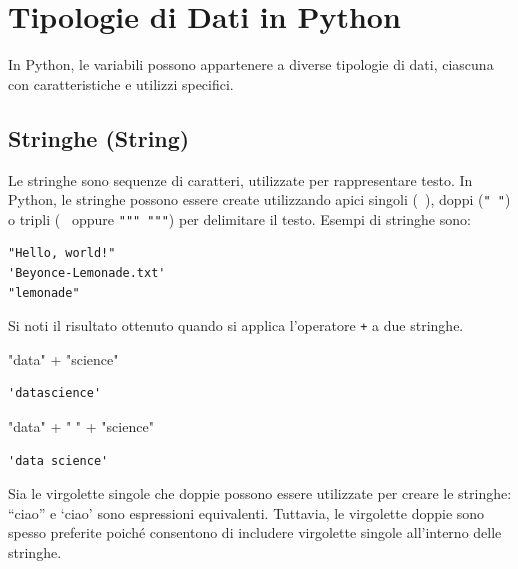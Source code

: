 \documentclass[
  letterpaper,
  krantz2]{{[}./krantz{]}}
\newenvironment{Shaded}{\begin{snugshade}}{\end{snugshade}}
\newcommand{\CommentTok}[1]{\textcolor[rgb]{0.37,0.37,0.37}{#1}}
\newcommand{\OperatorTok}[1]{\textcolor[rgb]{0.37,0.37,0.37}{#1}}
\newcommand{\StringTok}[1]{\textcolor[rgb]{0.13,0.47,0.30}{#1}}
\begin{document}
\section{Tipologie di Dati in Python}\label{tipologie-di-dati-in-python}

In Python, le variabili possono appartenere a diverse tipologie di dati,
ciascuna con caratteristiche e utilizzi specifici.

\subsection{Stringhe (String)}\label{stringhe-string}

Le stringhe sono sequenze di caratteri, utilizzate per rappresentare
testo. In Python, le stringhe possono essere create utilizzando apici
singoli (\texttt{\textquotesingle{}\ \textquotesingle{}}), doppi
(\texttt{"\ "}) o tripli
(\texttt{\textquotesingle{}\textquotesingle{}\textquotesingle{}\ \textquotesingle{}\textquotesingle{}\textquotesingle{}}
oppure \texttt{"""\ """}) per delimitare il testo. Esempi di stringhe
sono:

\begin{verbatim}
"Hello, world!"
'Beyonce-Lemonade.txt'
"lemonade"
\end{verbatim}

Si noti il risultato ottenuto quando si applica l'operatore \texttt{+} a
due stringhe.

\begin{Shaded}
\begin{Highlighting}[]
\CommentTok{"data"} \OperatorTok{+} \StringTok{"science"}
\end{Highlighting}
\end{Shaded}

\begin{verbatim}
'datascience'
\end{verbatim}

\begin{Shaded}
\begin{Highlighting}[]
\CommentTok{"data"} \OperatorTok{+} \StringTok{" "} \OperatorTok{+} \StringTok{"science"}
\end{Highlighting}
\end{Shaded}

\begin{verbatim}
'data science'
\end{verbatim}

Sia le virgolette singole che doppie possono essere utilizzate per
creare le stringhe: ``ciao'' e `ciao' sono espressioni equivalenti.
Tuttavia, le virgolette doppie sono spesso preferite poiché consentono
di includere virgolette singole all'interno delle stringhe.
\end{document}
